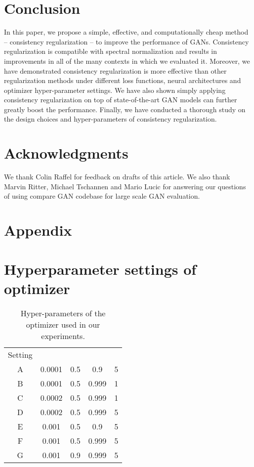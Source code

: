 \documentclass{article} \usepackage{iclr2020_conference,times}
\begin{document}
\section{Conclusion}
In this paper, we propose a simple, effective, and computationally cheap method -- consistency regularization -- to improve the performance of GANs.
Consistency regularization is compatible with spectral normalization and results in improvements in all of the many contexts in which we evaluated it.
Moreover, we have demonstrated consistency regularization is more effective than other regularization methods under different loss functions, neural architectures and optimizer hyper-parameter settings.
We have also shown simply applying consistency regularization on top of state-of-the-art GAN models can further greatly boost the performance. 
Finally, we have conducted a thorough study on the design choices and hyper-parameters of consistency regularization. 

\section*{Acknowledgments}
We thank Colin Raffel for feedback on drafts of this article.
We also thank Marvin Ritter, Michael Tschannen and Mario Lucic for answering our questions of using compare GAN codebase for large scale GAN evaluation. 






\newpage
\section*{Appendix}

\appendix
{}
\renewcommand{\thefigure}{A\arabic{figure}}
\setcounter{table}{0}
\renewcommand{\thetable}{A\arabic{table}}

\section{Hyperparameter settings of optimizer} \label{sec:hyper_settings}

\begin{table}[h]
\centering
\begin{tabular}{c|cccc}
 \hline
Setting   &  &   &  &  \\ \cline{1-5}
 A  & 0.0001  & 0.5  & 0.9   &  5    \\
 B  & 0.0001  & 0.5  & 0.999 &  1    \\ 
 C  & 0.0002  & 0.5  & 0.999 &  1    \\
 D  & 0.0002  & 0.5  & 0.999 &  5    \\
 E  & 0.001   & 0.5  & 0.9   &  5    \\
 F  & 0.001   & 0.5  & 0.999 &  5     \\
 G  & 0.001   & 0.9  & 0.999 &  5     \\
 
 \hline \hline
\end{tabular}
\caption{Hyper-parameters of the optimizer used in our experiments. 
} 
\label{tab:different_adam_parameter}
\end{table}
\end{document}
